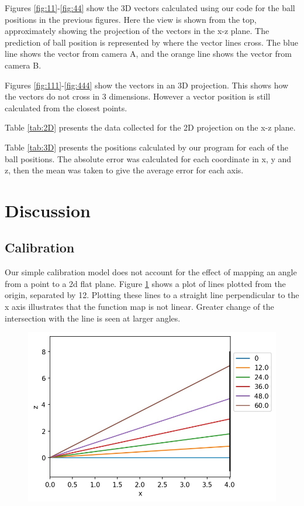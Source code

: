 \documentclass{article}
\begin{document}
Figures \ref{fig:11}-\ref{fig:44} show the 3D vectors calculated using our code for the ball positions in the previous figures. Here the view is shown from the top, approximately showing the projection of the vectors in the x-z plane. The prediction of ball position is represented by where the vector lines cross. The blue line shows the vector from camera A, and the orange line shows the vector from camera B.

Figures \ref{fig:111}-\ref{fig:444} show the vectors in an 3D projection. This shows how the vectors do not cross in 3 dimensions. However a vector position is still calculated from the closest points.

Table \ref{tab:2D} presents the data collected for the 2D projection on the x-z plane. 

Table \ref{tab:3D} presents the positions calculated by our program for each of the ball positions. The absolute error was calculated for each coordinate in x, y and z, then the mean was taken to give the average error for each axis. 

\section{Discussion}

\subsection{Calibration}

Our simple calibration model does not account for the effect of mapping an angle from a point to a 2d flat plane. Figure \ref{fig:lineplot1} shows a plot of lines plotted from the origin, separated by 12\textdegree. Plotting these lines to a straight line perpendicular to the x axis illustrates that the function map is not linear. Greater change of the intersection with the line is seen at larger angles. 

\begin{figure}[h!]
\centering
\includegraphics[width=.4\textheight]{lineplot.jpg}
\label{fig:lineplot1}
\end{figure}
\end{document}
